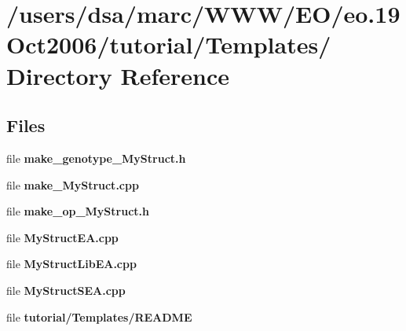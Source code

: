 \section{/users/dsa/marc/WWW/EO/eo.19Oct2006/tutorial/Templates/ Directory Reference}
\label{dir_000026}
\subsection*{Files}
\begin{CompactItemize}
\item 
file {\bf make_genotype_MyStruct.h}
\item 
file {\bf make_MyStruct.cpp}
\item 
file {\bf make_op_MyStruct.h}
\item 
file {\bf MyStructEA.cpp}
\item 
file {\bf MyStructLibEA.cpp}
\item 
file {\bf MyStructSEA.cpp}
\item 
file {\bf tutorial/Templates/README}
\end{CompactItemize}
